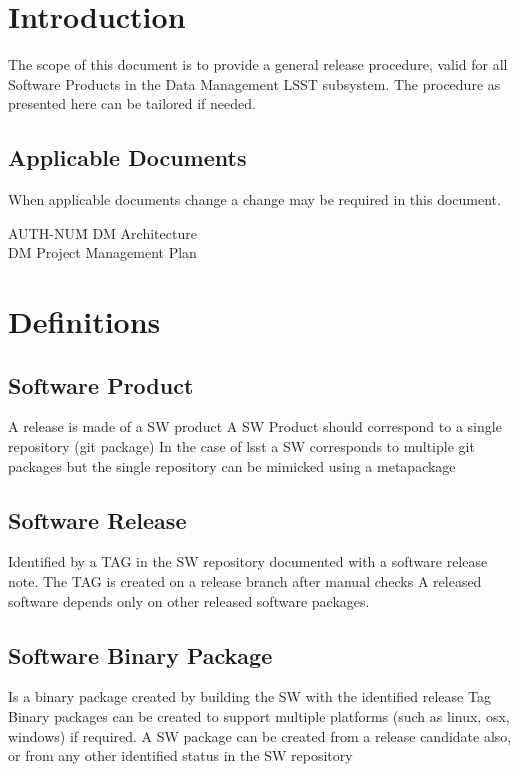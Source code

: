 \section{Introduction} \label{sec:intro}

The scope of this document is to provide a general release procedure, valid for all Software Products in the Data Management LSST subsystem. The procedure as presented here can be tailored if needed.

\subsection{Applicable Documents}

When applicable documents change a change may be required in this document.
\begin{tabbing}
AUTH-NUM\= \kill
{} \>     DM Architecture\\
 \>     DM Project Management Plan   \\
\end{tabbing}

\newpage
\section{Definitions} \label{sec:definitions}

\subsection{Software Product} \label{sect:swprod}
A release is made of a SW product
A SW Product should correspond to a single repository (git package)
In the case of lsst a SW corresponds to multiple git packages but the single repository can be mimicked using a metapackage 


\subsection{Software Release} \label{sect:swrel}
Identified by  a TAG in the SW repository
 documented with a software release note.
The TAG is created on a release branch after manual checks
A released software depends only on other released software packages.


\subsection{Software Binary Package} \label{sect:swbpkg}
Is a binary package created by building the SW with the identified release Tag 
Binary packages can be created to support multiple platforms (such as linux, osx, windows) if required.
A SW package can be created from a release candidate also, or from any other identified status  in the SW repository


